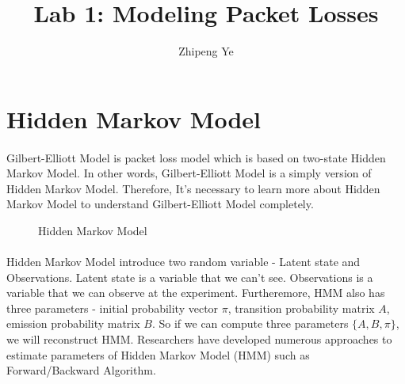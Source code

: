 \documentclass[11pt]{article}
\title{Lab 1: Modeling Packet Losses}
\author{Zhipeng Ye}
\affil{Department of Electrical and Electronic Engineering \\Xi’an Jiaotong-Liverpool University}
\begin{document}
\maketitle
    \section{Hidden Markov Model}
    \paragraph{}
    Gilbert-Elliott Model is packet loss model which is based on two-state Hidden Markov Model.
    In other words, Gilbert-Elliott Model is a simply version of Hidden Markov Model. 
    Therefore, It's necessary to learn more about Hidden Markov Model to understand Gilbert-Elliott Model completely.
    \begin{figure}[ht]
        \centering
        \caption{Hidden Markov Model}
        \label{fig:ch5:jointentropy}
    \end{figure}
    \paragraph{}
    Hidden Markov Model introduce two random variable - Latent state and Observations. Latent state is a variable that we can't see.
    Observations is a variable that we can observe at the experiment.
    Furtheremore, HMM also has three parameters - initial probability vector $\pi$, transition probability matrix $A$,
    emission probability matrix $B$. So if we can compute three parameters $\{A,B,\pi\}$, we will reconstruct HMM.
    Researchers have developed numerous approaches to estimate parameters of Hidden Markov Model (HMM) such as Forward/Backward Algorithm.
\end{document}
